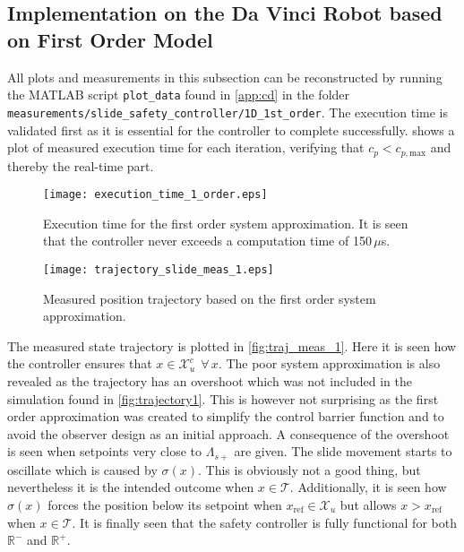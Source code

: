 \subsection{Implementation on the Da Vinci Robot based on First Order Model}\label{subsec:implement-davinci-1d}
All plots and measurements in this subsection can be reconstructed by running the MATLAB script \texttt{plot\_data} found in \autoref{app:cd} in the folder \texttt{measurements/slide\_safety\_controller/1D\_1st\_order}. The execution time is validated first as it is essential for the controller to complete successfully.  shows a plot of measured execution time for each iteration, verifying that $c_p < c_{p,\text{max}}$ and thereby the real-time part.
\begin{figure}[H]
	\center
		\texttt{[image: execution\_time\_1\_order.eps]}
	\caption{Execution time for the first order system approximation. It is seen that the controller never exceeds a computation time of 150\,$\mu$s.}
	\label{fig:exe_1}
\end{figure}



\begin{figure}[htbp]
\hspace{-7mm}
		\texttt{[image: trajectory\_slide\_meas\_1.eps]}
	\caption{Measured position trajectory based on the first order system approximation.}
    \label{fig:traj_meas_1}
\end{figure}
The measured state trajectory is plotted in \autoref{fig:traj_meas_1}.
Here it is seen how the controller ensures that $x \in \mathcal{X}_u^c \ \ \forall \, x$. The poor system approximation is also revealed as the trajectory has an overshoot which was not included in the simulation found in \autoref{fig:trajectory1}. This is however not surprising as the first order approximation was created to simplify the control barrier function and to avoid the observer design as an initial approach. A consequence of the overshoot is seen when setpoints very close to $\Lambda_{s+}$ are given. The slide movement starts to oscillate which is caused by $\sigma(x)$. This is obviously not a good thing, but nevertheless it is the intended outcome when $x \in \mathcal{T}$. Additionally, it is seen how $\sigma(x)$ forces the position below its setpoint when $x_\text{ref} \in \mathcal{X}_u$ but allows $x > x_\text{ref}$ when $x \in \mathcal{T}$. %
It is finally seen that the safety controller is fully functional for both $\mathbb{R}^-$ and $\mathbb{R}^+$.


